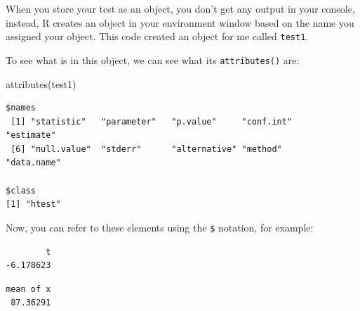 \documentclass[
  letterpaper,
]{book}
\newenvironment{Shaded}{\begin{snugshade}}{\end{snugshade}}
\newcommand{\FunctionTok}[1]{\textcolor[rgb]{0.28,0.35,0.67}{#1}}
\newcommand{\NormalTok}[1]{\textcolor[rgb]{0.00,0.23,0.31}{#1}}
\newcommand{\SpecialCharTok}[1]{\textcolor[rgb]{0.37,0.37,0.37}{#1}}
\begin{document}
When you store your test as an object, you don't get any output in your
console, instead, R creates an object in your environment window based
on the name you assigned your object. This code created an object for me
called \texttt{test1}.

To see what is in this object, we can see what its \texttt{attributes()}
are:

\begin{Shaded}
\begin{Highlighting}[]
\FunctionTok{attributes}\NormalTok{(test1)}
\end{Highlighting}
\end{Shaded}

\begin{verbatim}
$names
 [1] "statistic"   "parameter"   "p.value"     "conf.int"    "estimate"   
 [6] "null.value"  "stderr"      "alternative" "method"      "data.name"  

$class
[1] "htest"
\end{verbatim}

Now, you can refer to these elements using the \texttt{\$} notation, for
example:

\begin{Shaded}
\end{Shaded}

\begin{verbatim}
        t 
-6.178623 
\end{verbatim}

\begin{Shaded}
\end{Shaded}

\begin{verbatim}
mean of x 
 87.36291 
\end{verbatim}
\end{document}
